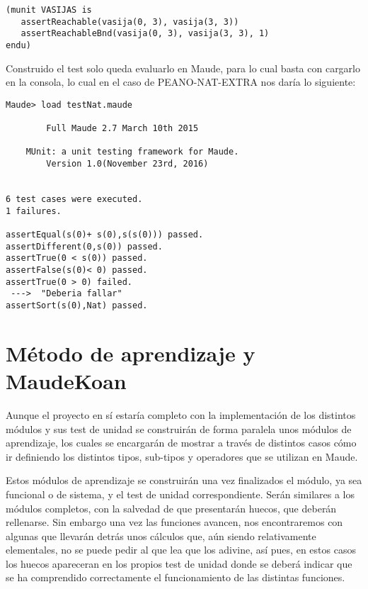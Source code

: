 {\codesize
\begin{verbatim}
(munit VASIJAS is
   assertReachable(vasija(0, 3), vasija(3, 3))
   assertReachableBnd(vasija(0, 3), vasija(3, 3), 1)
endu)
\end{verbatim}
}

Construido el test solo queda evaluarlo en Maude, para lo cual basta con cargarlo en la consola, lo cual en el caso de PEANO-NAT-EXTRA nos daría lo siguiente:\par

{\codesize
\begin{verbatim}
Maude> load testNat.maude

	    Full Maude 2.7 March 10th 2015

	MUnit: a unit testing framework for Maude.
		Version 1.0(November 23rd, 2016)


6 test cases were executed.
1 failures.

assertEqual(s(0)+ s(0),s(s(0))) passed.
assertDifferent(0,s(0)) passed.
assertTrue(0 < s(0)) passed.
assertFalse(s(0)< 0) passed.
assertTrue(0 > 0) failed.
 --->  "Deberia fallar"
assertSort(s(0),Nat) passed.
\end{verbatim}
}

\section{Método de aprendizaje y MaudeKoan}

Aunque el proyecto en sí estaría completo con la implementación de los distintos módulos y sus test de unidad se construirán de forma paralela unos módulos de aprendizaje, los cuales se encargarán de mostrar a través de distintos casos cómo ir definiendo los distintos tipos, sub-tipos y operadores que se utilizan en Maude.\par

Estos módulos de aprendizaje se construirán una vez finalizados el módulo, ya sea funcional o de sistema, y el test de unidad correspondiente. Serán similares a los módulos completos, con la salvedad de que presentarán huecos, que deberán rellenarse. Sin embargo una vez las funciones avancen, nos encontraremos con algunas que llevarán detrás unos cálculos que, aún siendo relativamente elementales, no se puede pedir al que lea que los adivine, así pues, en estos casos los huecos apareceran en los propios test de unidad donde se deberá indicar que se ha comprendido correctamente el funcionamiento de las distintas funciones. \par

